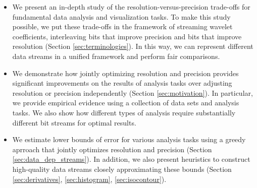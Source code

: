 \begin{itemize}
\item We present an in-depth study of the resolution-versus-precision trade-offs for fundamental
  data analysis and visualization tasks. To make this study possible, we put these trade-offs in the
  framework of streaming wavelet coefficients, interleaving bits that improve precision and bits
  that improve resolution (Section \ref{sec:terminologies}). In this way, we can represent different
  data streams in a unified framework and perform fair comparisons.
   
\item We demonstrate how jointly optimizing resolution and precision provides significant
  improvements on the results of analysis tasks over adjusting resolution or precision independently
  (Section \ref{sec:motivation}). In particular, we provide empirical evidence using a collection of
  data sets and analysis tasks. We also show how different types of analysis require substantially
  different bit streams for optimal results.

\item We estimate lower bounds of error for various analysis tasks using a greedy aprroach that
  jointly optimizes resolution and precision (Section \ref{sec:data_dep_streams}). In addition, we
  also present heuristics to construct high-quality data streams closely approximating these bounds
  (Section \ref{sec:derivatives}, \ref{sec:histogram}, \ref{sec:isocontour}).
\end{itemize}

